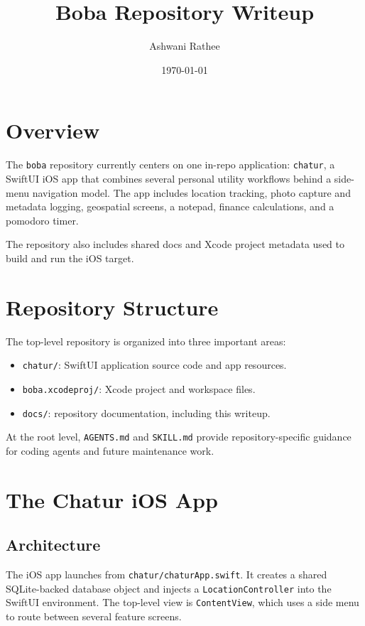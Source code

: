 \documentclass[11pt]{article}
\title{Boba Repository Writeup}
\author{Ashwani Rathee}
\date{\today}
\begin{document}
\maketitle

\section{Overview}
The \texttt{boba} repository currently centers on one in-repo application: \texttt{chatur}, a SwiftUI iOS app that combines several personal utility workflows behind a side-menu navigation model. The app includes location tracking, photo capture and metadata logging, geospatial screens, a notepad, finance calculations, and a pomodoro timer.

The repository also includes shared docs and Xcode project metadata used to build and run the iOS target.

\section{Repository Structure}
The top-level repository is organized into three important areas:

\begin{itemize}[leftmargin=*]
\item \texttt{chatur/}: SwiftUI application source code and app resources.
\item \texttt{boba.xcodeproj/}: Xcode project and workspace files.
\item \texttt{docs/}: repository documentation, including this writeup.
\end{itemize}

At the root level, \texttt{AGENTS.md} and \texttt{SKILL.md} provide repository-specific guidance for coding agents and future maintenance work.

\section{The Chatur iOS App}
\subsection{Architecture}
The iOS app launches from \texttt{chatur/chaturApp.swift}. It creates a shared SQLite-backed database object and injects a \texttt{LocationController} into the SwiftUI environment. The top-level view is \texttt{ContentView}, which uses a side menu to route between several feature screens.
\end{document}
